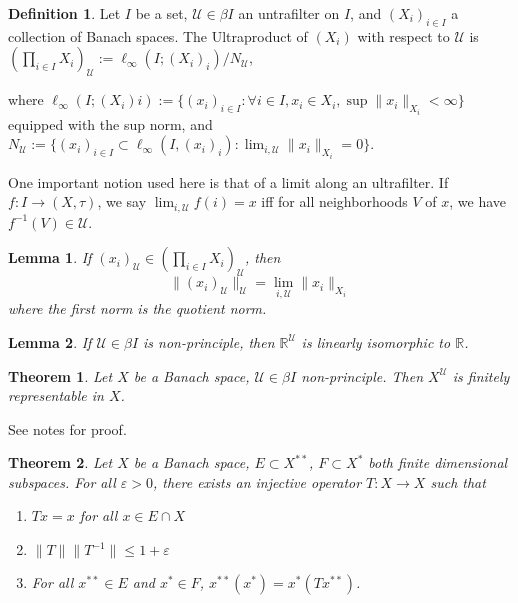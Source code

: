 \documentclass[11pt, reqno]{article}
\theoremstyle{plain}
\newtheorem*{theorem}{Theorem}
\newtheorem*{lemma}{Lemma}
\theoremstyle{definition}
\newtheorem*{definition}{Definition}
\theoremstyle{remark}
\renewcommand{\epsilon}{\varepsilon}
\newcommand{\RR}{\mathbb{R}}
\begin{document}
\begin{definition}
    Let $I$ be a set, $\mathcal{U} \in \beta I$ an untrafilter on $I$, and $(X_i)_{i \in I}$ a collection
    of Banach spaces. The Ultraproduct of $(X_i)$ with respect to $\mathcal{U}$ is 
    $(\prod_{i \in I} X_i)_{\mathcal{U}} := \ell_\infty(I; (X_i)_i)/N_\mathcal{U}$, 

    where $\ell_\infty(I; (X_i)i) := \{(x_i)_{i \in I}: \forall i \in I, x_i \in X_i, \sup \|x_i\|_{X_i} < \infty\}$
    equipped with the sup norm, and $N_\mathcal{U} := \{(x_i)_{i \in I} \subset \ell_\infty(I, (x_i)_i):
    \lim_{i, \mathcal{U}} \|x_i\|_{X_i} = 0\}$.
\end{definition}

One important notion used here is that of a limit along an ultrafilter. If $f:I \rightarrow (X,\tau)$,
we say $\lim_{i, \mathcal{U}} f(i) = x$ iff for all neighborhoods $V$ of $x$, we have $f^{-1}(V) \in \mathcal{U}$.

\begin{lemma}
    If $(x_i)_\mathcal{U} \in (\prod_{i \in I} X_i)_\mathcal{U}$, then 
    \[
        \|(x_i)_\mathcal{U}\|_\mathcal{U} = \lim_{i, \mathcal{U}}\|x_i\|_{X_i}
    \]
    where the first norm is the quotient norm.
\end{lemma}

\begin{lemma}
    If $\mathcal{U} \in \beta I$ is non-principle, then $\RR^{\mathcal{U}}$ is linearly isomorphic
    to $\RR$. 
\end{lemma}

\begin{theorem}
    Let $X$ be a Banach space, $\mathcal{U} \in \beta I$ non-principle. Then $X^{\mathcal{U}}$ is finitely 
    representable in $X$.
\end{theorem}

See notes for proof.

\begin{theorem}
    Let $X$ be a Banach space, $E \subset X^{**}$, $F \subset X^*$ both finite dimensional subspaces. For all $\epsilon > 0$,
    there exists an injective operator $T: X \rightarrow X$ such that 
    \begin{enumerate}
        \item $Tx = x$ for all $x \in E \cap X$
        \item $\|T\|\|T^{-1}\| \leq 1 + \epsilon$
        \item For all $x^{**} \in E$ and $x^* \in F$, $x^{**}(x^{*}) = x^*(Tx^{**})$.
    \end{enumerate}
\end{theorem}
\end{document}
